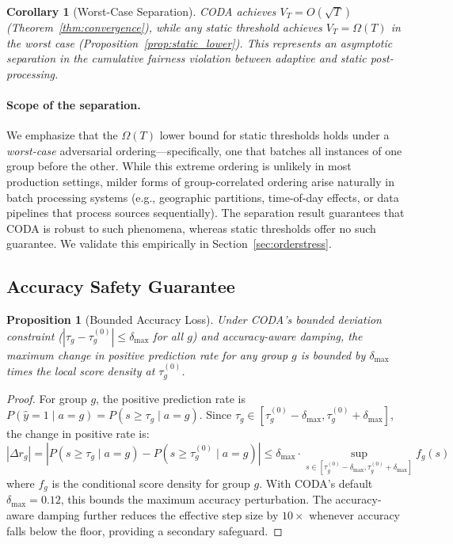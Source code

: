 \documentclass[10pt,twocolumn]{article}
\newtheorem{proposition}[theorem]{Proposition}
\newtheorem{corollary}[theorem]{Corollary}
\theoremstyle{definition}
\begin{document}
\begin{corollary}[Worst-Case Separation]
\label{cor:separation}
CODA achieves $V_T = O(\sqrt{T})$ (Theorem~\ref{thm:convergence}), while any static threshold achieves $V_T = \Omega(T)$ in the worst case (Proposition~\ref{prop:static_lower}). This represents an asymptotic separation in the cumulative fairness violation between adaptive and static post-processing.
\end{corollary}

\paragraph{Scope of the separation.}
We emphasize that the $\Omega(T)$ lower bound for static thresholds holds under a \emph{worst-case} adversarial ordering---specifically, one that batches all instances of one group before the other. While this extreme ordering is unlikely in most production settings, milder forms of group-correlated ordering arise naturally in batch processing systems (e.g., geographic partitions, time-of-day effects, or data pipelines that process sources sequentially). The separation result guarantees that CODA is robust to such phenomena, whereas static thresholds offer no such guarantee. We validate this empirically in Section~\ref{sec:orderstress}.

\subsection{Accuracy Safety Guarantee}

\begin{proposition}[Bounded Accuracy Loss]
\label{prop:accuracy}
Under CODA's bounded deviation constraint ($|\tau_g - \tau_g^{(0)}| \leq \delta_{\max}$ for all $g$) and accuracy-aware damping, the maximum change in positive prediction rate for any group $g$ is bounded by $\delta_{\max}$ times the local score density at $\tau_g^{(0)}$.
\end{proposition}

\begin{proof}
For group $g$, the positive prediction rate is $P(\hat{y}=1 \mid a=g) = P(s \geq \tau_g \mid a=g)$. Since $\tau_g \in [\tau_g^{(0)} - \delta_{\max}, \tau_g^{(0)} + \delta_{\max}]$, the change in positive rate is:
\[
|\Delta r_g| = |P(s \geq \tau_g \mid a=g) - P(s \geq \tau_g^{(0)} \mid a=g)| \leq \delta_{\max} \cdot \sup_{s \in [\tau_g^{(0)} - \delta_{\max}, \tau_g^{(0)} + \delta_{\max}]} f_g(s)
\]
where $f_g$ is the conditional score density for group $g$. With CODA's default $\delta_{\max} = 0.12$, this bounds the maximum accuracy perturbation. The accuracy-aware damping further reduces the effective step size by $10\times$ whenever accuracy falls below the floor, providing a secondary safeguard.
\end{proof}
\end{document}
